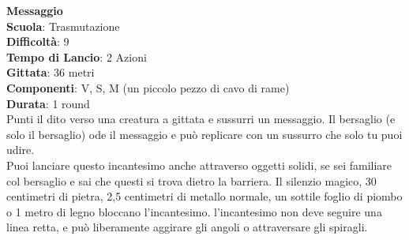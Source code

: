 \begin{multicols}{2}
\medskip\textbf{Messaggio}\\
\textbf{Scuola}: Trasmutazione\\
\textbf{Difficoltà}:  9\\
\textbf{Tempo di Lancio}: 2 Azioni\\
\textbf{Gittata}: 36 metri\\
\textbf{Componenti}: V, S, M (un piccolo pezzo di cavo di rame)\\
\textbf{Durata}: 1 round\\
Punti il dito verso una creatura a gittata e sussurri un messaggio. Il bersaglio (e solo il bersaglio) ode il messaggio e può replicare con un sussurro che solo tu puoi udire.\\
Puoi lanciare questo incantesimo anche attraverso oggetti solidi, se sei familiare col bersaglio e sai che questi si trova dietro la barriera. Il silenzio magico, 30 centimetri di pietra, 2,5 centimetri di metallo normale, un sottile foglio di piombo o 1 metro di legno bloccano l'incantesimo. l'incantesimo non deve seguire una linea retta, e può liberamente aggirare gli angoli o attraversare gli spiragli.


\end{multicols}
